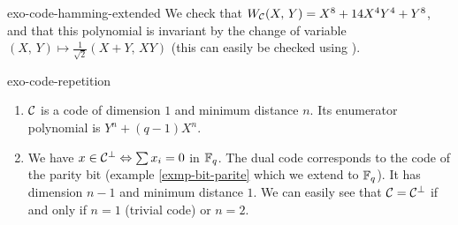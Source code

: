  
\begin{correction}{exo-code-hamming-extended}
We check that $ W_{\mathcal{C}} (X, \, Y) = X^8+14 X^4 Y^4 + Y^8 $, and that this polynomial is invariant by the change of variable $ (X, \, Y ) \mapsto \frac{1}{\sqrt{2}} (X + Y, \, XY) $ (this can easily be checked using \Maple{}).
\end{correction}
 
 
\begin{correction}{exo-code-repetition}
\begin{enumerate}
\item $ \mathcal{C} $ is a code of dimension $ 1 $ and minimum distance $ n $. Its enumerator polynomial is $ Y^n + (q-1) X^n $.
\item {}   We have $ x \in \mathcal{C}^\bot \Leftrightarrow \sum{x_i} = 0 $ in $ \mathbb{F}_q $. The dual code corresponds to the code of the parity bit (example \ref{exmp-bit-parite} which we extend to $ \mathbb{F}_q $). It has dimension $ n-1 $ and minimum distance $ 1 $. We can easily see that $ \mathcal{C} = \mathcal{C}^\bot $ if and only if $ n = 1 $ (trivial code) or $ n = 2 $.
\end{enumerate}
\end{correction}
 
